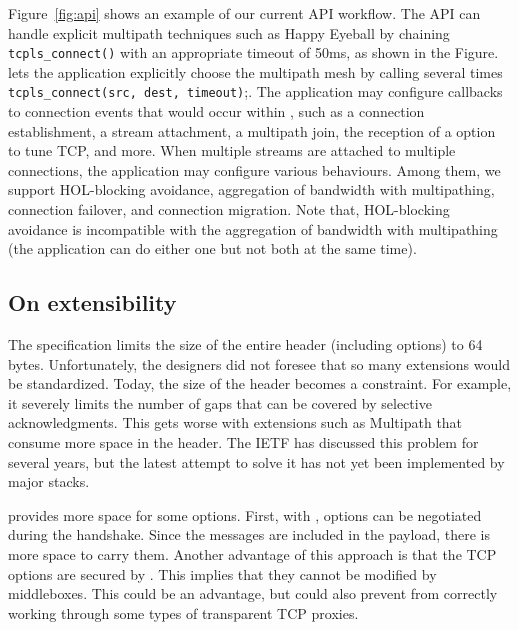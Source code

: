 Figure~\ref{fig:api}
shows an example of our current API workflow. The API can handle
explicit multipath techniques such as Happy Eyeball by chaining
\texttt{tcpls\_connect()} with an appropriate timeout of 50ms, as shown in the
Figure. \tcpls lets the application explicitly choose
the multipath mesh by calling several times \texttt{tcpls\_connect(src, dest,
  timeout)};. The application may configure callbacks to connection events that
would occur within \tcpls, such as a connection establishment, a stream
attachment, a multipath join, the reception of a \tcp option to tune TCP, and
more. When
multiple streams are attached to multiple \tcp connections, the application may
configure various \tcpls behaviours. Among them, we support HOL-blocking avoidance, aggregation of
bandwidth with multipathing, connection failover, and connection migration.
Note that, HOL-blocking avoidance is incompatible with the aggregation of bandwidth
with multipathing (the application can do either one but not both at the same
time).




\subsection{On \tcp extensibility}
\label{sec:tcpoptions}

The \tcp specification limits the size of the entire \tcp header (including options)
to 64 bytes. Unfortunately, the \tcp designers did not foresee that so many \tcp
extensions would be standardized. Today, the size of the \tcp header
becomes a constraint. For example, it severely limits the number of gaps that
can be covered by selective acknowledgments. This gets worse with extensions
such as Multipath \tcp \cite{rfc6824} that consume more space in the \tcp header.
The IETF has discussed this problem for several years, but the latest attempt
to solve it \cite{draft-ietf-tcpm-tcp-edo-10} has not yet been implemented by
major \tcp stacks.

\tcpls provides more space for some \tcp options. First, with \tcpls, \tcp
options can be negotiated during the \tls handshake. Since the \tls messages are
included in the \tcp payload, there is more space to carry them. Another
advantage of this approach is that the TCP options are secured by \tls. This
implies that they cannot be modified by middleboxes. This could be an advantage,
but could also prevent \tcpls from correctly working through some types of
transparent TCP proxies.

